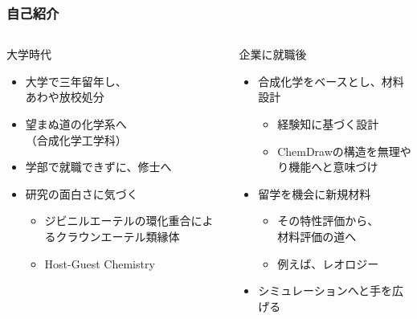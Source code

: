 \documentclass[12pt, dvipdfmx]{beamer}
\begin{document}
\begin{frame}
	\frametitle{自己紹介}
    \vspace{-3mm}
        \begin{columns}[T, onlytextwidth]
                \begin{block}{大学時代}
                    \begin{itemize}
                        \item 大学で三年留年し、\\あわや放校処分
                        \item 望まぬ道の化学系へ\\（合成化学工学科）
                        \item 学部で就職できずに、修士へ
                        \item 研究の面白さに気づく
                        \begin{itemize}
                            \item ジビニルエーテルの環化重合によるクラウンエーテル類縁体
                            \item Host-Guest Chemistry
                        \end{itemize}
                    \end{itemize}
                \end{block}
                \begin{exampleblock}{企業に就職後}
                    \begin{itemize}
                        \item 合成化学をベースとし、材料設計
                        \begin{itemize}
                            \item 経験知に基づく設計
                            \item ChemDrawの構造を無理やり機能へと意味づけ
                        \end{itemize}
                        \item 留学を機会に新規材料
                        \begin{itemize}
                            \item その特性評価から、\\材料評価の道へ
                            \item 例えば、レオロジー
                        \end{itemize}
                        \item シミュレーションへと手を広げる
                    \end{itemize}
                \end{exampleblock}
        \end{columns}
\end{frame}
\end{document}
